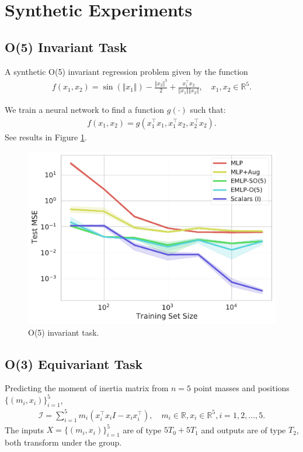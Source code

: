 \documentclass{article}
\date{}
\begin{document}
\section{Synthetic Experiments}
\subsection{O(5) Invariant Task} 
A synthetic O(5) invariant regression problem given by the function
\begin{align}f(x_1,x_2) = \sin(\Vert x_1\Vert)-\frac{\Vert x_2\Vert^3}{2}+\frac{x_1^\top x_2}{\Vert x_1\Vert\Vert x_2\Vert}, \quad x_1,x_2\in\mathbb{R}^5.
\end{align}

We train a neural network to find a function $g(\cdot)$ such that:
\begin{align}
    f(x_1,x_2) = g(x_1^\top x_1, x_1^\top x_2, x_2^\top x_2).
\end{align}
See results in Figure \ref{fig:O5invariant}.
\begin{figure}[H]
   \centering
   \includegraphics[scale=0.45]{data_efficiency_O5Synthetic.pdf}
   \caption{O(5) invariant task.}
   \label{fig:O5invariant}
\end{figure}

\subsection{O(3) Equivariant Task}
Predicting the moment of inertia matrix from $n=5$ point masses and positions $\{(m_i,x_i)\}_{i=1}^5$,
\begin{align}
\mathcal{I} =\sum_{i=1}^5 m_i(x_i^\top x_i I- x_ix_i^\top), \quad m_i\in\mathbb{R},x_i\in \mathbb{R}^5,i=1,2,\ldots,5.
\end{align}
The inputs $X = \{(m_i,x_i)\}_{i=1}^5$ are of type $5T_0+5T_1$ and outputs are of type $T_2$, both transform under the group.
\end{document}
